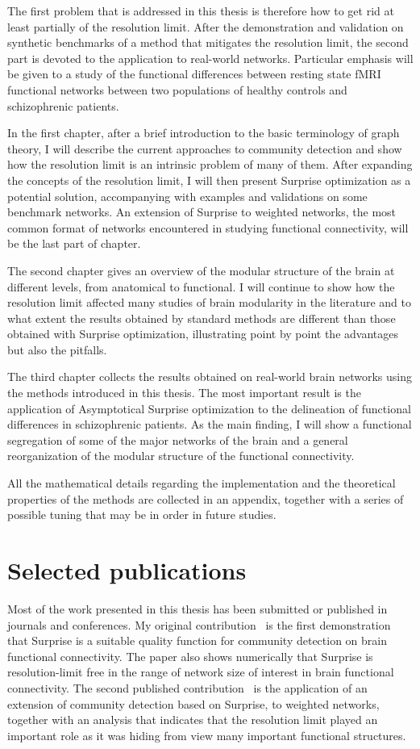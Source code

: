 {\color{red}The first problem that is addressed in this thesis is therefore how to get rid at least partially of the resolution limit. 
After the demonstration and validation on synthetic benchmarks of a method that mitigates the resolution limit, the second part is devoted to the application to real-world networks. Particular emphasis will be given to a study of the functional differences between resting state fMRI functional networks between two populations of healthy controls and schizophrenic patients. 

In the first chapter, after a brief introduction to the basic terminology of graph theory, I will describe the current approaches to community detection and show how the resolution limit is an intrinsic problem of many of them. After expanding the concepts of the resolution limit, I will then present Surprise optimization as a potential solution, accompanying with examples and validations on some benchmark networks. An extension of Surprise to weighted networks, the most common format of networks encountered in studying functional connectivity, will be the last part of chapter.

The second chapter gives an overview of the modular structure of the brain at different levels, from anatomical to functional. I will continue to show how the resolution limit affected many studies of brain modularity in the literature and to what extent the results obtained by standard methods are different than those obtained with Surprise optimization, illustrating point by point the advantages but also the pitfalls.

The third chapter collects the results obtained on real-world brain networks using the methods introduced in this thesis. The most important result is the application of Asymptotical Surprise optimization to the delineation of functional differences in schizophrenic patients. As the main finding, I will show a functional segregation of some of the major networks of the brain and a general reorganization of the modular structure of the functional connectivity.

All the mathematical details regarding the implementation and the theoretical properties of the methods are collected in an appendix, together with a series of possible tuning that may be in order in future studies.}

\section*{Selected publications}
Most of the work presented in this thesis has been submitted or published in journals and conferences. My original contribution~\cite{nicolini2016} is the first demonstration that Surprise is a suitable quality function for community detection on brain functional connectivity.
The paper also shows numerically that Surprise is resolution-limit free in the range of network size of interest in brain functional connectivity.
The second published contribution~\cite{nicolini2017} is the application of an extension of community detection based on Surprise, to weighted networks, together with an analysis that indicates that the resolution limit played an important role as it was hiding from view many important functional structures.